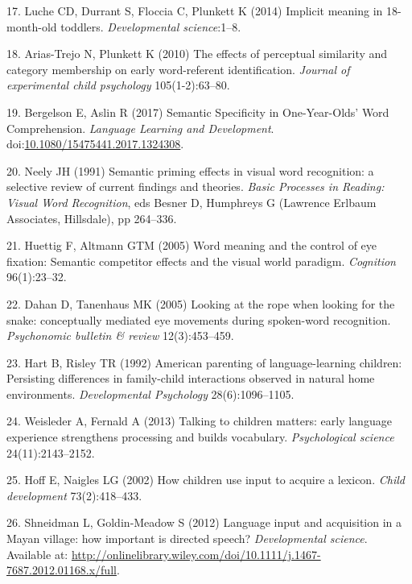 \documentclass[9pt,twocolumn,twoside,]{pnas-new}
\begin{document}
\hypertarget{ref-Luche2014}{}
17. Luche CD, Durrant S, Floccia C, Plunkett K (2014) Implicit meaning
in 18-month-old toddlers. \emph{Developmental science}:1--8.

\hypertarget{ref-Arias-Trejo2010}{}
18. Arias-Trejo N, Plunkett K (2010) The effects of perceptual
similarity and category membership on early word-referent
identification. \emph{Journal of experimental child psychology}
105(1-2):63--80.

\hypertarget{ref-Bergelson2017}{}
19. Bergelson E, Aslin R (2017) Semantic Specificity in One-Year-Olds'
Word Comprehension. \emph{Language Learning and Development}.
doi:\href{https://doi.org/10.1080/15475441.2017.1324308}{10.1080/15475441.2017.1324308}.

\hypertarget{ref-Neely1991}{}
20. Neely JH (1991) Semantic priming effects in visual word recognition:
a selective review of current findings and theories. \emph{Basic
Processes in Reading: Visual Word Recognition}, eds Besner D, Humphreys
G (Lawrence Erlbaum Associates, Hillsdale), pp 264--336.

\hypertarget{ref-Huettig2005}{}
21. Huettig F, Altmann GTM (2005) Word meaning and the control of eye
fixation: Semantic competitor effects and the visual world paradigm.
\emph{Cognition} 96(1):23--32.

\hypertarget{ref-Dahan2005}{}
22. Dahan D, Tanenhaus MK (2005) Looking at the rope when looking for
the snake: conceptually mediated eye movements during spoken-word
recognition. \emph{Psychonomic bulletin \& review} 12(3):453--459.

\hypertarget{ref-Hart1992}{}
23. Hart B, Risley TR (1992) American parenting of language-learning
children: Persisting differences in family-child interactions observed
in natural home environments. \emph{Developmental Psychology}
28(6):1096--1105.

\hypertarget{ref-Weisleder2013}{}
24. Weisleder A, Fernald A (2013) Talking to children matters: early
language experience strengthens processing and builds vocabulary.
\emph{Psychological science} 24(11):2143--2152.

\hypertarget{ref-Hoff2002}{}
25. Hoff E, Naigles LG (2002) How children use input to acquire a
lexicon. \emph{Child development} 73(2):418--433.

\hypertarget{ref-Shneidman2012}{}
26. Shneidman L, Goldin‐Meadow S (2012) Language input and acquisition
in a Mayan village: how important is directed speech?
\emph{Developmental science}. Available at:
\url{http://onlinelibrary.wiley.com/doi/10.1111/j.1467-7687.2012.01168.x/full}.
\end{document}
